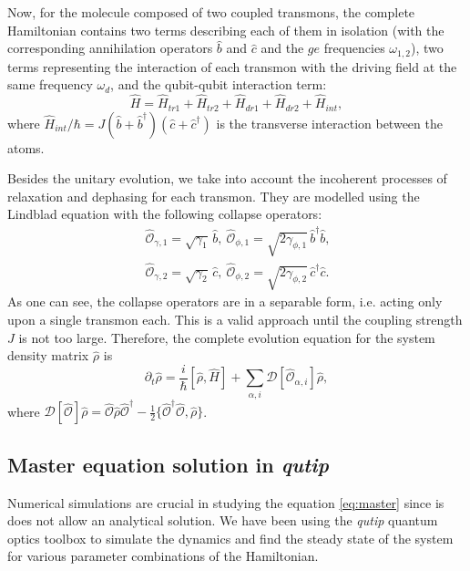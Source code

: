 \documentclass[%
 aip,
 amsmath,amssymb,
 reprint,%
]{revtex4-1}
\begin{document}
Now, for the molecule composed of two coupled transmons, the complete Hamiltonian contains two terms describing each of them in isolation (with the corresponding annihilation operators $\hat b$ and $\hat c$ and the $ge$ frequencies $\omega_{1,2}$), two terms representing the interaction of each transmon with the driving field at the same frequency $\omega_d$, and the qubit-qubit interaction term:
\begin{equation}\label{Hsystem}
\hat H = \hat H_{tr1}+\hat H_{tr2}+\hat H_{dr1}+\hat H_{dr2}+\hat H_{int},
\end{equation}
where $\hat H_{int}/\hbar= J (\hat b +\hat b^\dag)(\hat c+\hat c^{\dagger})$ is the transverse interaction between the atoms.

Besides the unitary evolution, we take into account the incoherent processes of relaxation and dephasing for each transmon. They are modelled using the Lindblad equation with the following collapse operators:
\begin{equation}\
\begin{split}
\hat{\mathcal{O}}_{\gamma, 1} = \sqrt{\gamma_1}\, \hat b,\ 
\hat{\mathcal{O}}_{\phi, 1} = \sqrt{2\gamma_{\phi,1}}\, \hat b^\dag \hat b,\\
\hat{\mathcal{O}}_{\gamma,2} = \sqrt{\gamma_2}\, \hat c,\ 
\hat{\mathcal{O}}_{\phi,2} = \sqrt{2\gamma_{ \phi,2}}\, \hat c^\dag \hat c.
\end{split}
\end{equation}
As one can see, the collapse operators are in a separable form, i.e. acting only upon a single transmon each. This is a valid approach until the coupling strength $J$ is not too large\cite{beaudoin2011dissipation}. Therefore, the complete evolution equation for the system density matrix $\hat \rho$ is
\begin{equation}
\partial_t \hat \rho = \frac{i}{\hbar} [\hat \rho, \hat H] + \sum_{\alpha, i} \mathcal{D}[\hat{\mathcal{O}}_{\alpha, i}] \hat \rho, \label{eq:master}
\end{equation}
where $\mathcal{D}[\hat{\mathcal{O}}]\hat \rho = \hat{\mathcal{O}} \hat \rho \hat{\mathcal{O}}^\dag - \frac{1}{2}\{ \hat{\mathcal{O}}^\dag \hat{\mathcal{O}}, \hat \rho\}$.



\subsection{Master equation solution in \textit{qutip}}

Numerical simulations are crucial in studying the equation \eqref{eq:master} since is does not allow an analytical solution. We have been using the \textit{qutip}\cite{johansson2013qutip} quantum optics toolbox to simulate the dynamics and find the steady state of the system for various parameter combinations of the Hamiltonian.
\end{document}
